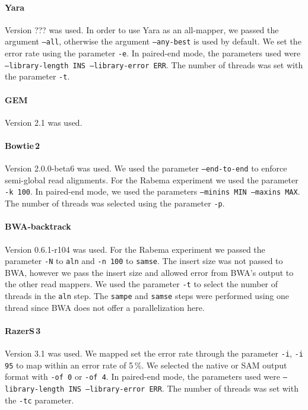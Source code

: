 \paragraph{Yara}
Version ??? was used.
In order to use Yara as an all-mapper, we passed the argument \texttt{--all}, otherwise the argument \texttt{--any-best} is used by default.
We set the error rate using the parameter \texttt{-e}.
In paired-end mode, the parameters used were \texttt{--library-length INS --library-error ERR}.
The number of threads was set with the parameter \texttt{-t}.

\paragraph{GEM}
Version 2.1 was used.

\paragraph{Bowtie\,2}
Version 2.0.0-beta6 was used.
We used the parameter \texttt{--end-to-end} to enforce semi-global read alignments.
For the Rabema experiment we used the parameter \texttt{-k 100}.
In paired-end mode, we used the parameters \texttt{--minins MIN --maxins MAX}.
The number of threads was selected using the parameter \texttt{-p}.

\paragraph{BWA-backtrack}
Version 0.6.1-r104 was used.
For the Rabema experiment we passed the parameter \texttt{-N} to \texttt{aln} and \texttt{-n 100} to \texttt{samse}.
The insert size was not passed to BWA, however we pass the insert size and allowed error from BWA's output to the other read mappers.
We used the parameter \texttt{-t} to select the number of threads in the \texttt{aln} step.
The {\tt sampe} and {\tt samse} steps were performed using one thread since BWA does not offer a parallelization here.

\paragraph{RazerS\,3}
Version 3.1 was used.
We mapped set the error rate through the parameter \texttt{-i}, \eg \texttt{-i 95} to map within an error rate of 5\,\%.
We selected the native or SAM output format with \texttt{-of 0} or \texttt{-of 4}.
In paired-end mode, the parameters used were \texttt{--library-length INS --library-error ERR}.
The number of threads was set with the \texttt{-tc} parameter.

